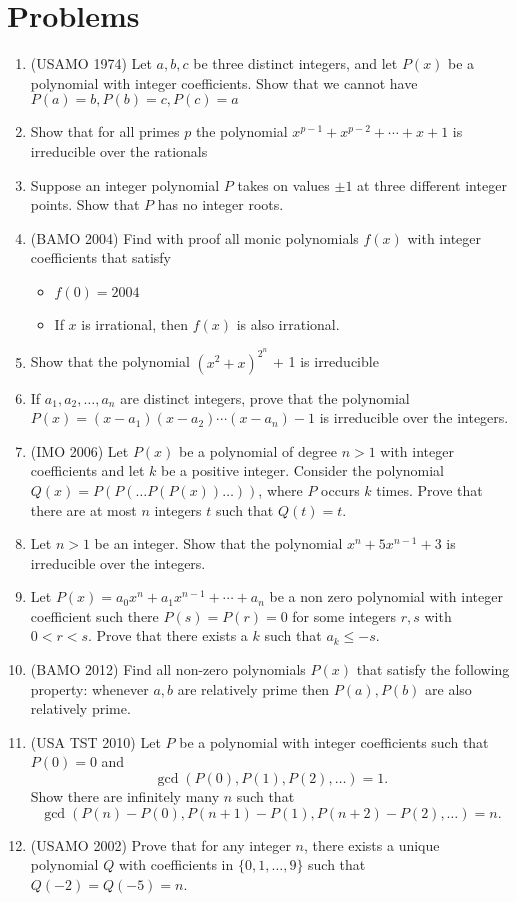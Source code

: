 \documentclass[11pt]{article}
\theoremstyle{theorem}
\theoremstyle{definition}
\theoremstyle{remark}
\theoremstyle{definition}
\theoremstyle{remark}
\begin{document}
\section{Problems}
\begin{enumerate}
\item (USAMO 1974) Let $a,b,c$ be three distinct integers, and let $P(x)$ be a polynomial with integer coefficients. Show that we cannot have $P(a)=b, P(b)=c, P(c)=a$
\item Show that for all primes $p$ the polynomial $x^{p-1}+x^{p-2}+\cdots+x+1$ is irreducible over the rationals
\item Suppose an integer polynomial $P$ takes on values $\pm 1$ at three different integer points. Show that $P$ has no integer roots.
\item (BAMO 2004) Find with proof all monic polynomials $f(x)$ with integer coefficients that satisfy
\begin{itemize}
\item $f(0) = 2004$
\item If $x$ is irrational, then $f(x)$ is also irrational.
\end{itemize}
\item Show that the polynomial $(x^2+x)^{2^n}$ + 1 is irreducible
\item If $a_1, a_2, \ldots, a_n$ are distinct integers, prove that the polynomial $P(x)=(x-a_1)(x-a_2)\cdots(x-a_n)-1$ is irreducible over the integers.
\item (IMO 2006) Let $P(x)$ be a polynomial of degree $n > 1$ with integer coefficients and let $k$ be a positive integer. Consider the polynomial $Q(x) = P(P(\ldots P(P(x)) \ldots ))$, where $P$ occurs $k$ times. Prove that there are at most $n$ integers $t$ such that $Q(t) = t$.
\item Let $n>1$ be an integer. Show that the polynomial $x^n+5x^{n-1}+3$ is irreducible over the integers.
\item Let $P(x) = a_0x^n+a_1x^{n-1} + \cdots + a_n$ be a non zero polynomial with integer coefficient such there $P(s) = P(r) = 0$ for some integers $r,s$ with $0 < r < s$. Prove that there exists a $k$ such that $a_k \le -s$.
\item (BAMO 2012) Find all non-zero polynomials $P(x)$ that satisfy the following property: whenever $a,b$ are relatively prime then $P(a),P(b)$ are also relatively prime.
\item (USA TST 2010) Let $P$ be a polynomial with integer coefficients such that $P(0)=0$ and
\[\gcd(P(0), P(1), P(2), \ldots ) = 1.\]
Show there are infinitely many $n$ such that
\[\gcd(P(n)- P(0), P(n+1)-P(1), P(n+2)-P(2), \ldots) = n.\]
\item (USAMO 2002) Prove that for any integer $n$, there exists a unique polynomial $Q$ with coefficients in $\{0,1,\ldots,9\}$ such that $Q(-2) = Q(-5) = n$.
\end{enumerate}
\end{document}
